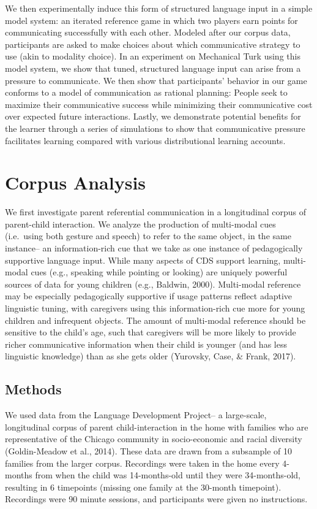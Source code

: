 \documentclass[english,,man,floatsintext]{apa6}
\begin{document}
We then experimentally induce this form of structured language input in a simple model system: an iterated reference game in which two players earn points for communicating successfully with each other. Modeled after our corpus data, participants are asked to make choices about which communicative strategy to use (akin to modality choice). In an experiment on Mechanical Turk using this model system, we show that tuned, structured language input can arise from a pressure to communicate. We then show that participants' behavior in our game conforms to a model of communication as rational planning: People seek to maximize their communicative success while minimizing their communicative cost over expected future interactions. Lastly, we demonstrate potential benefits for the learner through a series of simulations to show that communicative pressure facilitates learning compared with various distributional learning accounts.

\hypertarget{corpus-analysis}{%
\section{Corpus Analysis}\label{corpus-analysis}}

We first investigate parent referential communication in a longitudinal corpus of parent-child interaction. We analyze the production of multi-modal cues (i.e.~using both gesture and speech) to refer to the same object, in the same instance-- an information-rich cue that we take as one instance of pedagogically supportive language input. While many aspects of CDS support learning, multi-modal cues (e.g., speaking while pointing or looking) are uniquely powerful sources of data for young children (e.g., Baldwin, 2000). Multi-modal reference may be especially pedagogically supportive if usage patterns reflect adaptive linguistic tuning, with caregivers using this information-rich cue more for young children and infrequent objects. The amount of multi-modal reference should be sensitive to the child's age, such that caregivers will be more likely to provide richer communicative information when their child is younger (and has less linguistic knowledge) than as she gets older (Yurovsky, Case, \& Frank, 2017).

\hypertarget{methods}{%
\subsection{Methods}\label{methods}}

We used data from the Language Development Project-- a large-scale, longitudinal corpus of parent child-interaction in the home with families who are representative of the Chicago community in socio-economic and racial diversity (Goldin-Meadow et al., 2014). These data are drawn from a subsample of 10 families from the larger corpus. Recordings were taken in the home every 4-months from when the child was 14-months-old until they were 34-months-old, resulting in 6 timepoints (missing one family at the 30-month timepoint). Recordings were 90 minute sessions, and participants were given no instructions.
\end{document}
